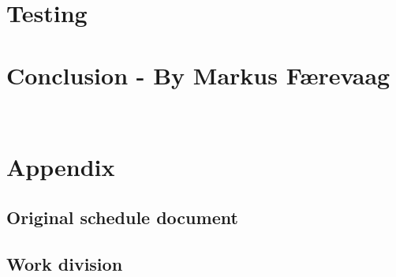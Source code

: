 \documentclass[danish]{article}
\begin{document}
\section{Testing}








\section{Conclusion - By Markus Færevaag}
 \\

\section{Appendix}
\subsection{Original schedule document}

\subsection{Work division}

\end{document}
